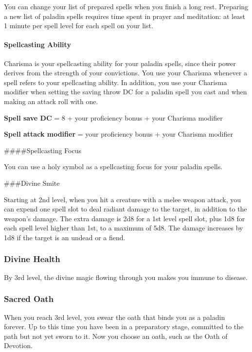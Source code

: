 \documentclass[
]{article}
\begin{document}
You can change your list of prepared spells when you finish a long rest.
Preparing a new list of paladin spells requires time spent in prayer and
meditation: at least 1 minute per spell level for each spell on your
list.

\hypertarget{spellcasting-ability}{%
\paragraph{Spellcasting Ability}\label{spellcasting-ability}}

Charisma is your spellcasting ability for your paladin spells, since
their power derives from the strength of your convictions. You use your
Charisma whenever a spell refers to your spellcasting ability. In
addition, you use your Charisma modifier when setting the saving throw
DC for a paladin spell you cast and when making an attack roll with one.

\textbf{Spell save DC} = 8 + your proficiency bonus + your Charisma
modifier

\textbf{Spell attack modifier} = your proficiency bonus + your Charisma
modifier

\#\#\#\#Spellcasting Focus

You can use a holy symbol as a spellcasting focus for your paladin
spells.

\#\#\#Divine Smite

Starting at 2nd level, when you hit a creature with a melee weapon
attack, you can expend one spell slot to deal radiant damage to the
target, in addition to the weapon's damage. The extra damage is 2d8 for
a 1st level spell slot, plus 1d8 for each spell level higher than 1st,
to a maximum of 5d8. The damage increases by 1d8 if the target is an
undead or a fiend.

\hypertarget{divine-health}{%
\subsubsection{Divine Health}\label{divine-health}}

By 3rd level, the divine magic flowing through you makes you immune to
disease.

\hypertarget{sacred-oath}{%
\subsubsection{Sacred Oath}\label{sacred-oath}}

When you reach 3rd level, you swear the oath that binds you as a paladin
forever. Up to this time you have been in a preparatory stage, committed
to the path but not yet sworn to it. Now you choose an oath, such as the
Oath of Devotion.
\end{document}
